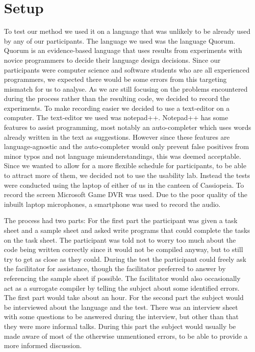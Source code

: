 \chapter{Setup}
To test our method we used it on a language that was unlikely to be already used by any of our participants.
The language we used was the language Quorum.
Quorum is an evidence-based language that uses results from experiments with novice programmers to decide their language design decisions.
Since our participants were computer science and software students who are all experienced programmers, we expected there would be some errors from this targeting mismatch for us to analyse.
As we are still focusing on the problems encountered during the process rather than the resulting code, we decided to record the experiments.
To make recording easier we decided to use a text-editor on a computer.
The text-editor we used was notepad++.
Notepad++ has some features to assist programming, most notably an auto-completer which uses words already written in the text as suggestions.
However since these features are language-agnostic and the auto-completer would only prevent false positives from minor typos and not language misunderstandings, this was deemed acceptable.%
Since we wanted to allow for a more flexible schedule for participants, to be able to attract more of them, we decided not to use the usability lab.
Instead the tests were conducted using the laptop of either of us in the canteen of Cassiopeia.
To record the screen Microsoft Game DVR was used.
Due to the poor quality of the inbuilt laptop microphones, a smartphone was used to record the audio.%

The process had two parts:
For the first part the participant was given a task sheet and a sample sheet and asked write programs that could complete the tasks on the task sheet.
The participant was told not to worry too much about the code being written correctly since it would not be compiled anyway, but to still try to get as close as they could.
During the test the participant could freely ask the facilitator for assistance, though the facilitator preferred to answer by referencing the sample sheet if possible.
The facilitator would also occasionally act as a surrogate compiler by telling the subject about some identified errors.%
The first part would take about an hour.
For the second part the subject would be interviewed about the language and the test.
There was an interview sheet with some questions to be answered during the interview, but other than that they were more informal talks.
During this part the subject would usually be made aware of most of the otherwise unmentioned errors, to be able to provide a more informed discussion.



